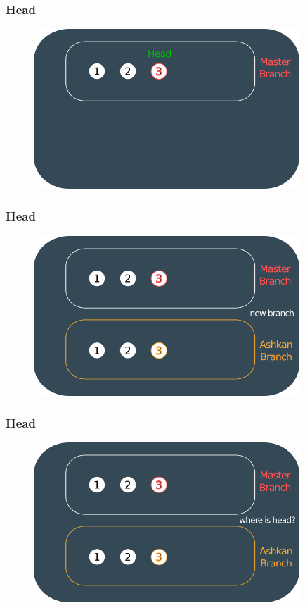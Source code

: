 \documentclass{beamer}
\begin{document}
	\begin{frame}
		\frametitle{Head}
		\begin{figure}[htbp]
			\centering
			\includegraphics[width=10cm]{head4}
		\end{figure}
	\end{frame}
	
	\begin{frame}
		\frametitle{Head}
		\begin{figure}[htbp]
			\centering
			\includegraphics[width=10cm]{head5}
		\end{figure}
	\end{frame}
	
	\begin{frame}
		\frametitle{Head}
		\begin{figure}[htbp]
			\centering
			\includegraphics[width=10cm]{head6}
		\end{figure}
	\end{frame}
	
\end{document}
